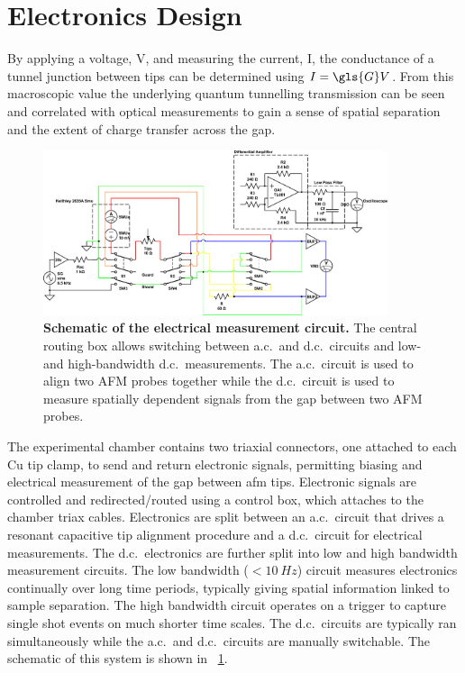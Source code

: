 \documentclass{article}
\begin{document}
\section{Electronics Design}

By applying a voltage, \gls{V}, and measuring the current, \gls{I}, the conductance of a tunnel junction between tips can be determined using $I=\gls{G}V$. From this macroscopic value the underlying quantum tunnelling transmission can be seen and correlated with optical measurements to gain a sense of spatial separation and the extent of charge transfer across the gap. %

\begin{figure}[bt]
\centering
\includegraphics[width=0.9\textwidth]{figures/tip_experiment_circuit_design}
\caption[Schematic of the electrical measurement circuit.]{\textbf{Schematic of the electrical measurement circuit.} The central routing box allows switching between a.c.\ and d.c.\ circuits and low-and high-bandwidth d.c.\ measurements. The a.c.\ circuit is used to align two AFM probes together while the d.c.\ circuit is used to measure spatially dependent signals from the gap between two AFM probes.}
\label{fig:circuit_design}
\end{figure}

The experimental chamber contains two triaxial connectors, one attached to each Cu tip clamp, to send and return electronic signals, permitting biasing and electrical measurement of the gap between \gls{afm} tips. Electronic signals are controlled and {\color{red}redirected/routed} using a control box, which attaches to the chamber triax cables. Electronics are split between an a.c.\ circuit that drives a resonant capacitive tip alignment procedure and a d.c.\ circuit for electrical measurements. The d.c.\ electronics are further split into low and high bandwidth measurement circuits. The low bandwidth ($<\SI{10}{Hz}$) circuit measures electronics continually over long time periods, typically giving spatial information linked to sample separation. The high bandwidth circuit operates on a trigger to capture single shot events on much shorter time scales. The d.c.\ circuits are typically ran simultaneously while the a.c.\ and d.c.\ circuits are manually switchable. The schematic of this system is shown in \figurename~\ref{fig:circuit_design}.
\end{document}
